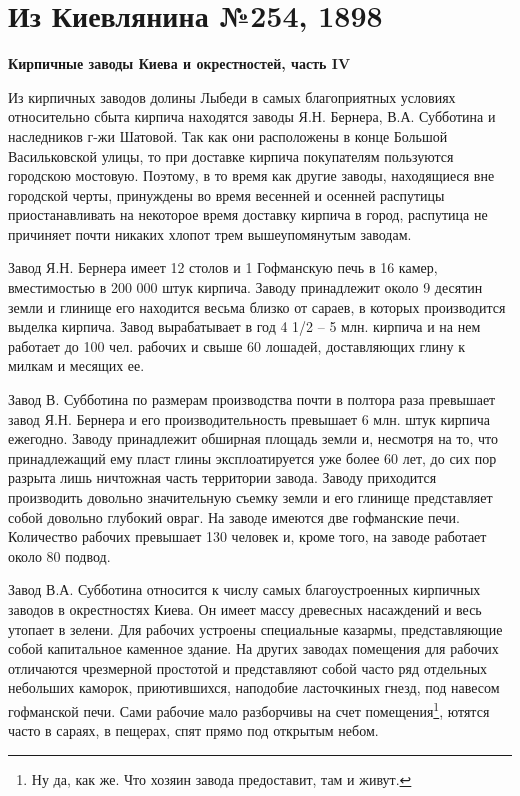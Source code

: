 \chapter*{Из Киевлянина №254, 1898}

\textbf{Кирпичные заводы Киева и окрестностей, часть IV}

Из кирпичных заводов долины Лыбеди в самых благоприятных условиях относительно сбыта кирпича находятся заводы Я.Н. Бернера, В.А. Субботина и наследников г-жи Шатовой. Так как они расположены в конце Большой Васильковской улицы, то при доставке кирпича покупателям пользуются городскою мостовую. Поэтому, в то время как другие заводы, находящиеся вне городской черты, принуждены во время весенней и осенней распутицы приостанавливать на некоторое время доставку кирпича в город, распутица не причиняет почти никаких хлопот трем вышеупомянутым заводам.

Завод Я.Н. Бернера имеет 12 столов и 1 Гофманскую печь в 16 камер, вместимостью в 200 000 штук кирпича. Заводу принадлежит около 9 десятин земли и глинище его находится весьма близко от сараев, в которых производится выделка кирпича. Завод вырабатывает в год 4 1/2 – 5 млн. кирпича и на нем работает до 100 чел. рабочих и свыше 60 лошадей, доставляющих глину к милкам и месящих ее.

Завод В. Субботина по размерам производства почти в полтора раза превышает завод Я.Н. Бернера и его производительность превышает 6 млн. штук кирпича ежегодно. Заводу принадлежит обширная площадь земли и, несмотря на то, что принадлежащий ему пласт глины эксплоатируется уже более 60 лет, до сих пор разрыта лишь ничтожная часть территории завода. Заводу приходится производить довольно значительную съемку земли и его глинище представляет собой довольно глубокий овраг. На заводе имеются две гофманские печи. Количество рабочих превышает 130 человек и, кроме того, на заводе работает около 80 подвод. 

Завод В.А. Субботина относится к числу самых благоустроенных кирпичных заводов в окрестностях Киева. Он имеет массу древесных насаждений и весь утопает в зелени. Для рабочих устроены специальные казармы, представляющие собой капитальное каменное здание. На других заводах помещения для рабочих отличаются чрезмерной простотой и представляют собой часто ряд отдельных небольших каморок, приютившихся, наподобие ласточкиных гнезд, под навесом гофманской печи. Сами рабочие мало разборчивы на счет помещения\footnote{Ну да, как же. Что хозяин завода предоставит, там и живут.}, ютятся часто в сараях, в пещерах, спят прямо под открытым небом.

